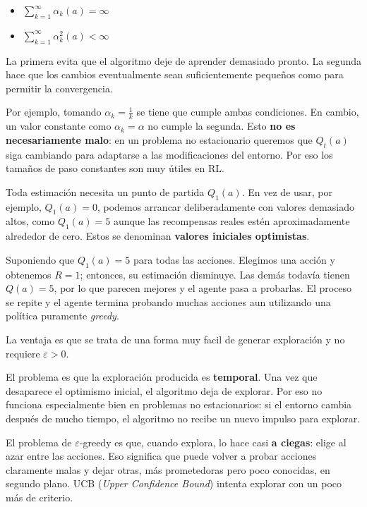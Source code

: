\documentclass[11pt,a4paper]{article}
\begin{document}
\begin{itemize}
    \item $\sum_{k=1}^{\infty}\alpha_k(a)=\infty$
    \item $\sum_{k=1}^{\infty}\alpha_k^2(a)<\infty$
\end{itemize}


La primera evita que el algoritmo deje de aprender demasiado pronto. La segunda
hace que los cambios eventualmente sean suficientemente pequeños como para
permitir la convergencia.

Por ejemplo, tomando $\alpha_k=\frac{1}{k}$ se tiene que cumple ambas condiciones. En cambio, un valor constante como $\alpha_k=\alpha$ no cumple la segunda. Esto \textbf{no es necesariamente malo}: en un problema
no estacionario queremos que $Q_t(a)$ siga cambiando para adaptarse a las
modificaciones del entorno. Por eso los tamaños de paso constantes son muy
útiles en RL.

Toda estimación necesita un punto de partida $Q_1(a)$. En vez de usar, por
ejemplo, $Q_1(a)=0$, podemos arrancar deliberadamente con valores demasiado
altos, como $Q_1(a)=5$ aunque las recompensas reales estén aproximadamente alrededor de cero. Estos se denominan \textbf{valores iniciales optimistas}.

Suponiendo que $Q_1(a)=5$ para todas las acciones. Elegimos una acción y
obtenemos $R=1$; entonces, su estimación disminuye. Las demás todavía tienen
$Q(a)=5$, por lo que parecen mejores y el agente pasa a probarlas. El proceso se
repite y el agente termina probando muchas acciones aun utilizando una política
puramente \textit{greedy}.

La ventaja es que se trata de una forma muy facil de generar
exploración y no requiere $\varepsilon>0$.

El problema es que la exploración producida es \textbf{temporal}. Una vez que
desaparece el optimismo inicial, el algoritmo deja de explorar. Por eso no
funciona especialmente bien en problemas no estacionarios: si el entorno cambia
después de mucho tiempo, el algoritmo no recibe un nuevo impulso para explorar.

El problema de $\varepsilon$-greedy es que, cuando explora, lo hace casi
\textbf{a ciegas}: elige al azar entre las acciones. Eso significa que puede
volver a probar acciones claramente malas y dejar otras, más prometedoras pero
poco conocidas, en segundo plano. UCB (\textit{Upper Confidence Bound}) intenta
explorar con un poco más de criterio.
\end{document}
